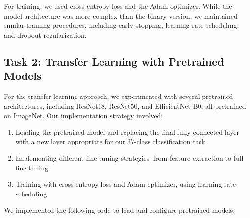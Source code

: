\documentclass[
]{article}
\providecommand{\tightlist}{%
  \setlength{\itemsep}{0pt}\setlength{\parskip}{0pt}}\usepackage{longtable,booktabs,array}
\begin{document}
For training, we used cross-entropy loss and the Adam optimizer. While
the model architecture was more complex than the binary version, we
maintained similar training procedures, including early stopping,
learning rate scheduling, and dropout regularization.

\subsection{Task 2: Transfer Learning with Pretrained
Models}\label{task-2-transfer-learning-with-pretrained-models}

For the transfer learning approach, we experimented with several
pretrained architectures, including ResNet18, ResNet50, and
EfficientNet-B0, all pretrained on ImageNet. Our implementation strategy
involved:

\begin{enumerate}
\def\labelenumi{\arabic{enumi}.}
\tightlist
\item
  Loading the pretrained model and replacing the final fully connected
  layer with a new layer appropriate for our 37-class classification
  task
\item
  Implementing different fine-tuning strategies, from feature extraction
  to full fine-tuning
\item
  Training with cross-entropy loss and Adam optimizer, using learning
  rate scheduling
\end{enumerate}

We implemented the following code to load and configure pretrained
models:
\end{document}
